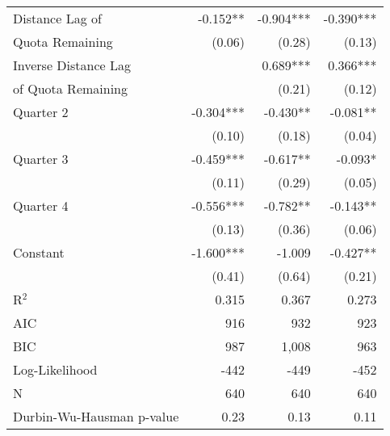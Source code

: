 {\begin{tabular}{l*{3}{r}}
Distance Lag of     &      -0.152** &      -0.904***&      -0.390***\\
Quota Remaining     &      (0.06)   &      (0.28)   &      (0.13)   \\
Inverse Distance Lag&               &       0.689***&       0.366***\\
of Quota Remaining  &               &      (0.21)   &      (0.12)   \\
Quarter 2           &      -0.304***&      -0.430** &      -0.081** \\
                    &      (0.10)   &      (0.18)   &      (0.04)   \\
Quarter 3           &      -0.459***&      -0.617** &      -0.093*  \\
                    &      (0.11)   &      (0.29)   &      (0.05)   \\
Quarter 4           &      -0.556***&      -0.782** &      -0.143** \\
                    &      (0.13)   &      (0.36)   &      (0.06)   \\
Constant               &      -1.600***&      -1.009   &      -0.427** \\
                    &      (0.41)   &      (0.64)   &      (0.21)   \\
\hline
R$^2$                  &       0.315   &       0.367   &       0.273   \\
AIC                 &         916   &         932   &         923   \\
BIC                 &         987   &       1,008   &         963   \\
Log-Likelihood                  &        -442   &        -449   &        -452   \\
N                   &         640   &         640   &         640   \\
Durbin-Wu-Hausman p-value & 0.23 & 0.13 & 0.11\\
\hline\hline
\end{tabular}
}
